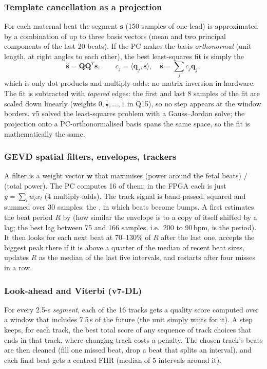 \documentclass[11pt]{article}
\begin{document}
\subsubsection*{Template cancellation as a projection}
For each maternal beat the segment $\mathbf{s}$ (150 samples of one lead) is approximated by a combination of up to three basis vectors (mean and two principal components of the last 20 beats). If the PC makes the basis \emph{orthonormal} (unit length, at right angles to each other), the best least-squares fit is simply the 
\[
\hat{\mathbf{s}} = \mathbf{Q}\mathbf{Q}^T\mathbf{s}, \qquad c_j = \langle \mathbf{q}_j, \mathbf{s} \rangle,\quad \hat{\mathbf{s}} = \textstyle\sum_j c_j \mathbf{q}_j ,
\]
which is only dot products and multiply-adds: no matrix inversion in hardware. The fit is subtracted with \emph{tapered} edges: the first and last 8 samples of the fit are scaled down linearly (weights $0, \tfrac17, \dots, 1$ in Q15), so no step appears at the window borders. v5 solved the least-squares problem with a Gauss--Jordan solve; the projection onto a PC-orthonormalised basis spans the same space, so the fit is mathematically the same.

\subsubsection*{GEVD spatial filters, envelopes, trackers}
A  filter is a weight vector $\mathbf{w}$ that maximises (power around the fetal beats) / (total power). The PC computes 16 of them; in the FPGA each is just $y = \sum_l w_l x_l$ (4 multiply-adds). The track signal is band-passed, squared and summed over 30 samples: the , in which beats become bumps. A  first estimates the beat period $R$ by  (how similar the envelope is to a copy of itself shifted by a lag; the best lag between 75 and 166 samples, i.e.\ 200 to 90\,bpm, is the period). It then looks for each next beat at 70--130\% of $R$ after the last one, accepts the biggest peak there if it is above a quarter of the median of recent beat sizes, updates $R$ as the median of the last five intervals, and restarts after four misses in a row.

\subsubsection*{Look-ahead and Viterbi (v7-DL)}
For every 2.5-s \emph{segment}, each of the 16 tracks gets a quality score computed over a window that includes 7.5\,s of the future (the unit simply waits for it). A  step keeps, for each track, the best total score of any sequence of track choices that ends in that track, where changing track costs a penalty. The chosen track's beats are then cleaned (fill one missed beat, drop a beat that splits an interval), and each final beat gets a centred FHR (median of 5 intervals around it).
\end{document}
